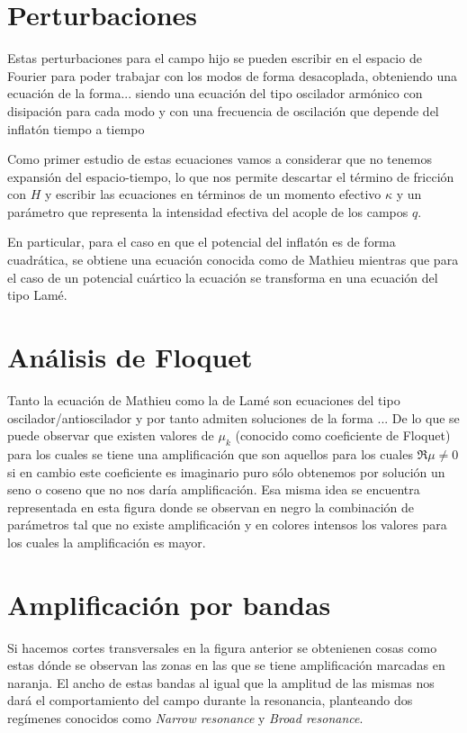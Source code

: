 \documentclass[letterpaper,12pt]{report}
\begin{document}
  \section{Perturbaciones}
    Estas perturbaciones para el campo hijo se pueden escribir en el espacio de Fourier para poder trabajar con los modos de forma desacoplada, obteniendo una ecuación de la forma... siendo una ecuación del tipo oscilador armónico con disipación para cada modo y con una frecuencia de oscilación que depende del inflatón tiempo a tiempo

    Como primer estudio de estas ecuaciones vamos a considerar que no tenemos expansión del espacio-tiempo, lo que nos permite descartar el término de fricción con $H$ y escribir las ecuaciones en términos de un momento efectivo $\kappa$ y un parámetro que representa la intensidad efectiva del acople de los campos $q$.

    En particular, para el caso en que el potencial del inflatón es de forma cuadrática, se obtiene una ecuación conocida como de Mathieu mientras que para el caso de un potencial cuártico la ecuación se transforma en una ecuación del tipo Lamé. 
    
  \section{Análisis de Floquet}
    Tanto la ecuación de Mathieu como la de Lamé son ecuaciones del tipo oscilador/antioscilador y por tanto admiten soluciones de la forma ... De lo que se puede observar que existen valores de $\mu_k$ (conocido como coeficiente de Floquet) para los cuales se tiene una amplificación que son aquellos para los cuales $\Re{\mu} \neq 0$ si en cambio este coeficiente es imaginario puro sólo obtenemos por solución un seno o coseno que no nos daría amplificación. Esa misma idea se encuentra representada en esta figura donde se observan en negro la combinación de parámetros tal que no existe amplificación y en colores intensos los valores para los cuales la amplificación es mayor.
    
  \section{Amplificación por bandas}
    Si hacemos cortes transversales en la figura anterior se obtenienen cosas como estas dónde se observan las zonas en las que se tiene amplificación marcadas en naranja. El ancho de estas bandas al igual que la amplitud de las mismas nos dará el comportamiento del campo durante la resonancia, planteando dos regímenes conocidos como \textit{Narrow resonance} y \textit{Broad resonance}.
  
\end{document}
